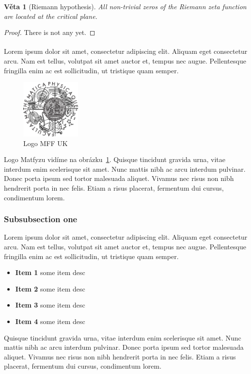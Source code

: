 \documentclass[12pt,a4paper]{article}
\newtheorem{theorem}{Věta}
\theoremstyle{definition}
\begin{document}
\begin{theorem}[Riemann hypothesis]
All non-trivial zeros of the Riemann zeta function are located at the critical plane.
\end{theorem}
\begin{proof}
There is not any yet.
\end{proof}

\paragraph{}
Lorem ipsum dolor sit amet, consectetur adipiscing elit. Aliquam eget consectetur arcu. Nam est tellus, volutpat sit amet auctor et, tempus nec augue. Pellentesque fringilla enim ac est sollicitudin, ut tristique quam semper. 

\begin{figure}[h]
	\centering
	\includegraphics[width=30mm]{logo.eps}
	\caption{Logo MFF UK}
	\label{fig:mff}
\end{figure}

Logo Matfyzu vidíme na obrázku~\ref{fig:mff}. Quisque tincidunt gravida urna, vitae interdum enim scelerisque sit amet. Nunc mattis nibh ac arcu interdum pulvinar. Donec porta ipsum sed tortor malesuada aliquet. Vivamus nec risus non nibh hendrerit porta in nec felis. Etiam a risus placerat, fermentum dui cursus, condimentum lorem.


\subsubsection{Subsubsection one}
Lorem ipsum dolor sit amet, consectetur adipiscing elit. Aliquam eget consectetur arcu. Nam est tellus, volutpat sit amet auctor et, tempus nec augue. Pellentesque fringilla enim ac est sollicitudin, ut tristique quam semper.
\begin{itemize}
	\item \textbf{Item 1} some item desc
	\item \textbf{Item 2} some item desc
	\item \textbf{Item 3} some item desc
	\item \textbf{Item 4} some item desc
\end{itemize}
Quisque tincidunt gravida urna, vitae interdum enim scelerisque sit amet. Nunc mattis nibh ac arcu interdum pulvinar. 
Donec porta ipsum sed tortor malesuada aliquet. Vivamus nec risus non nibh hendrerit porta in nec felis. Etiam a risus placerat, fermentum dui cursus, condimentum lorem.
\end{document}

